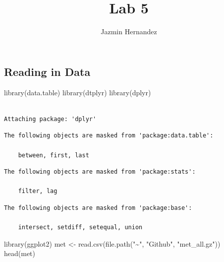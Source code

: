 \documentclass[
  letterpaper,
  DIV=11,
  numbers=noendperiod]{scrartcl}
\title{Lab 5}
\author{Jazmin Hernandez}
\date{}
\newenvironment{Shaded}{\begin{snugshade}}{\end{snugshade}}
\newcommand{\FunctionTok}[1]{\textcolor[rgb]{0.28,0.35,0.67}{#1}}
\newcommand{\NormalTok}[1]{\textcolor[rgb]{0.00,0.23,0.31}{#1}}
\newcommand{\OtherTok}[1]{\textcolor[rgb]{0.00,0.23,0.31}{#1}}
\newcommand{\StringTok}[1]{\textcolor[rgb]{0.13,0.47,0.30}{#1}}
\begin{document}
\maketitle


\subsection{Reading in Data}\label{reading-in-data}

\begin{Shaded}
\begin{Highlighting}[]
\FunctionTok{library}\NormalTok{(data.table)}
\FunctionTok{library}\NormalTok{(dtplyr)}
\FunctionTok{library}\NormalTok{(dplyr)}
\end{Highlighting}
\end{Shaded}

\begin{verbatim}

Attaching package: 'dplyr'
\end{verbatim}

\begin{verbatim}
The following objects are masked from 'package:data.table':

    between, first, last
\end{verbatim}

\begin{verbatim}
The following objects are masked from 'package:stats':

    filter, lag
\end{verbatim}

\begin{verbatim}
The following objects are masked from 'package:base':

    intersect, setdiff, setequal, union
\end{verbatim}

\begin{Shaded}
\begin{Highlighting}[]
\FunctionTok{library}\NormalTok{(ggplot2)}
\NormalTok{met }\OtherTok{\textless{}{-}} \FunctionTok{read.csv}\NormalTok{(}\FunctionTok{file.path}\NormalTok{(}\StringTok{"\textasciitilde{}"}\NormalTok{, }\StringTok{"Github"}\NormalTok{, }\StringTok{"met\_all.gz"}\NormalTok{))}
\FunctionTok{head}\NormalTok{(met)}
\end{Highlighting}
\end{Shaded}
\end{document}
